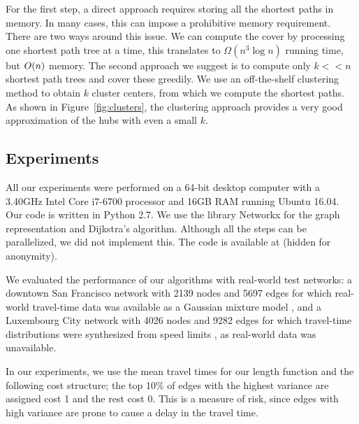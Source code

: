 \vspace{-0.5em}
\begin{remark}
For the first step, a direct approach requires storing all the shortest paths in memory.
In many cases, this can impose a prohibitive memory requirement.
There are two ways around this issue.
We can compute the cover by processing one shortest path tree at a time, this translates to $\Omega(n^3\log n)$ running time, but $O(n)$ memory.
The second approach we suggest is to compute only $k<<n$ shortest path trees and cover these greedily.
We use an off-the-shelf clustering method to obtain $k$ cluster centers, from which we compute the shortest paths. 
As shown in Figure~\ref{fig:clusters}, the clustering approach provides a very good approximation of the hubs with even a small $k$.
\end{remark}

\subsection{Experiments} 
\label{sec:exp}

All our experiments were performed on a 64-bit desktop computer with a 3.40GHz Intel Core i7-6700 processor and 16GB RAM running Ubuntu 16.04.
Our code is written in Python 2.7.
We use the library Networkx for the graph representation and Dijkstra's algorithm.
Although all the steps can be parallelized, we did not implement this.
The code is available at (hidden for anonymity).%

We evaluated the performance of our algorithms with real-world test networks: a downtown San Francisco network with 2139 nodes and 5697 edges for which real-world travel-time data was available as a Gaussian mixture model \cite{sf_data}, and a Luxembourg City network with 4026 nodes and 9282 edges for which travel-time distributions were synthesized from speed limits \cite{niknami2016tractable}, as real-world data was unavailable.
 
In our experiments, we use the mean travel times for our length function and the following cost structure; the top 10\% of edges with the highest variance are assigned cost 1 and the rest cost 0.
This is a measure of risk, since edges with high variance are prone to cause a delay in the travel time.


